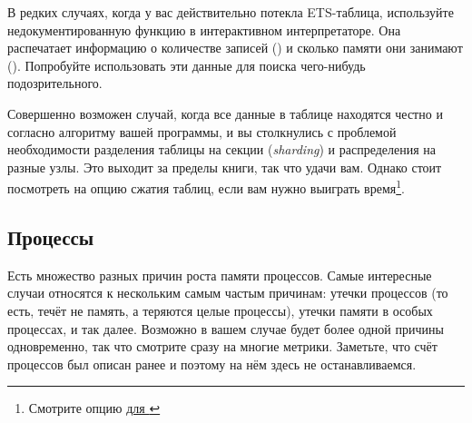 В редких случаях, когда у вас действительно потекла ETS-таблица, используйте недокументированную функцию  в интерактивном интерпретаторе. Она распечатает информацию о количестве записей () и сколько памяти они занимают (). Попробуйте использовать эти данные для поиска чего-нибудь подозрительного.

Совершенно возможен случай, когда все данные в таблице находятся честно и согласно алгоритму вашей программы, и вы столкнулись с проблемой необходимости разделения таблицы на секции (\emph{sharding}) и распределения на разные узлы. Это выходит за пределы книги, так что удачи вам. Однако стоит посмотреть на опцию сжатия таблиц, если вам нужно выиграть время\footnote{Смотрите опцию \href{http://www.erlang.org/doc/man/ets.html\#new-2}{ для }}.


\subsection{Процессы}

Есть множество разных причин роста памяти процессов. Самые интересные случаи относятся к нескольким самым частым причинам: утечки процессов (то есть, течёт не память, а теряются целые процессы), утечки памяти в особых процессах, и так далее. Возможно в вашем случае будет более одной причины одновременно, так что смотрите сразу на многие метрики. Заметьте, что счёт процессов был описан ранее и поэтому на нём здесь не останавливаемся.


